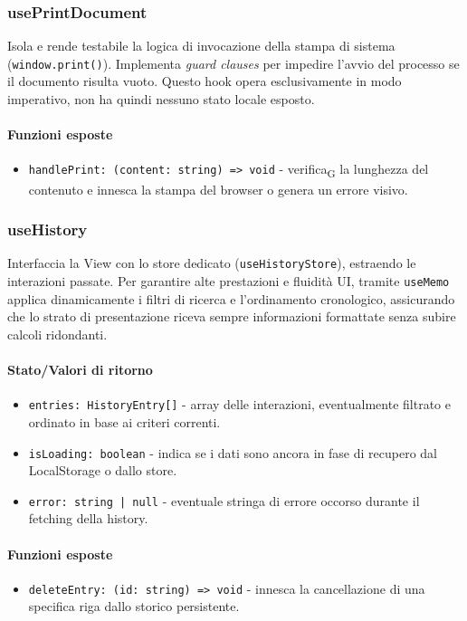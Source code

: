 \documentclass[11pt,a4paper]{article}
\newcommand{\gls}[1]{#1\textsubscript{G}}
\begin{document}
\subsubsection{usePrintDocument}
Isola e rende testabile la logica di invocazione della stampa di sistema (\texttt{window.print()}). Implementa \textit{guard clauses} per impedire l'avvio del processo se il documento risulta vuoto.
Questo hook opera esclusivamente in modo imperativo, non ha quindi nessuno stato locale esposto.


\paragraph{Funzioni esposte}
\begin{itemize}
    \item \texttt{handlePrint: (content: string) => void} - \gls{verifica} la lunghezza del contenuto e innesca la stampa del browser o genera un errore visivo.
\end{itemize}


\subsubsection{useHistory}
Interfaccia la View con lo store dedicato (\texttt{useHistoryStore}), estraendo le interazioni passate. Per garantire alte prestazioni e fluidità UI, tramite \texttt{useMemo} applica dinamicamente i filtri di ricerca e l'ordinamento cronologico, assicurando che lo strato di presentazione riceva sempre informazioni formattate senza subire calcoli ridondanti.


\paragraph{Stato/Valori di ritorno}
\begin{itemize}
    \item \texttt{entries: HistoryEntry[]} - array delle interazioni, eventualmente filtrato e ordinato in base ai criteri correnti.
    \item \texttt{isLoading: boolean} - indica se i dati sono ancora in fase di recupero dal LocalStorage o dallo store.
    \item \texttt{error: string | null} - eventuale stringa di errore occorso durante il fetching della history.
\end{itemize}

\paragraph{Funzioni esposte}
\begin{itemize}
    \item \texttt{deleteEntry: (id: string) => void} - innesca la cancellazione di una specifica riga dallo storico persistente.
\end{itemize}
\end{document}
